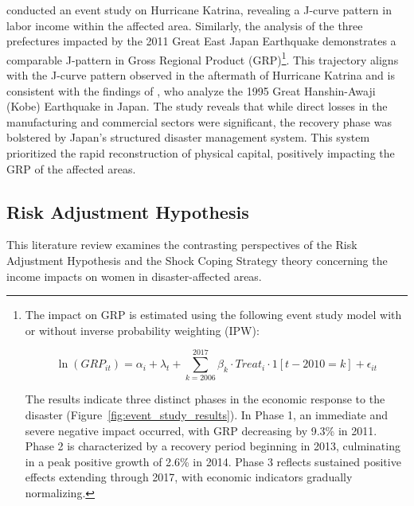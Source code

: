 \documentclass[a4paper,12pt]{article}
\begin{document}
\citet{Deryugina2018TheReturns} conducted an event study on Hurricane Katrina, revealing a J-curve pattern in labor income within the affected area. Similarly, the analysis of the three prefectures impacted by the 2011 Great East Japan Earthquake demonstrates a comparable J-pattern in Gross Regional Product (GRP)\footnote{The impact on GRP is estimated using the following event study model with or without inverse probability weighting (IPW):

\begin{equation}
\ln(GRP_{it}) = \alpha_i + \lambda_t + \sum_{k=2006}^{2017} \beta_k \cdot Treat_i \cdot 1[t-2010=k] + \epsilon_{it}
\end{equation}

The results indicate three distinct phases in the economic response to the disaster (Figure~\ref{fig:event_study_results}). In Phase 1, an immediate and severe negative impact occurred, with GRP decreasing by 9.3\% in 2011. Phase 2 is characterized by a recovery period beginning in 2013, culminating in a peak positive growth of 2.6\% in 2014. Phase 3 reflects sustained positive effects extending through 2017, with economic indicators gradually normalizing.}. This trajectory aligns with the J-curve pattern observed in the aftermath of Hurricane Katrina and is consistent with the findings of \citet{Toyoda2008EconomicYears}, who analyze the 1995 Great Hanshin-Awaji (Kobe) Earthquake in Japan. The study reveals that while direct losses in the manufacturing and commercial sectors were significant, the recovery phase was bolstered by Japan’s structured disaster management system. This system prioritized the rapid reconstruction of physical capital, positively impacting the GRP of the affected areas.


\subsection{Risk Adjustment Hypothesis}

This literature review examines the contrasting perspectives of the Risk Adjustment Hypothesis and the Shock Coping Strategy theory concerning the income impacts on women in disaster-affected areas.
\end{document}
